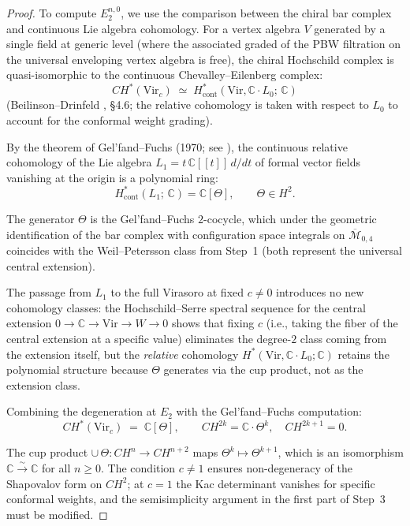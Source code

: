 \begin{proof}
To compute $E_2^{n,0}$, we use the comparison between the chiral bar
complex and continuous Lie algebra cohomology.  For a vertex algebra $V$
generated by a single field at generic level (where the associated graded
of the PBW filtration on the universal enveloping vertex algebra is free),
the chiral Hochschild complex is quasi-isomorphic to the continuous
Chevalley--Eilenberg complex:
\[
CH^*(\mathrm{Vir}_c) \;\simeq\;
H^*_{\mathrm{cont}}(\mathrm{Vir}, \mathbb{C} \cdot L_0;\, \mathbb{C})
\]
(Beilinson--Drinfeld \cite{BD04}, \S4.6; the relative cohomology is taken
with respect to $L_0$ to account for the conformal weight grading).


By the theorem of Gel'fand--Fuchs (1970; see \cite[Ch.~2, \S2]{Fuks86}),
the continuous relative cohomology of the Lie algebra $L_1 = t\,\mathbb{C}[[t]]\,d/dt$
of formal vector fields vanishing at the origin is a polynomial ring:
\[
H^*_{\mathrm{cont}}(L_1;\, \mathbb{C}) = \mathbb{C}[\Theta],
\qquad \Theta \in H^2.
\]

The generator $\Theta$ is the Gel'fand--Fuchs $2$-cocycle, which under the
geometric identification of the bar complex with configuration space integrals
on $\overline{\mathcal{M}}_{0,4}$ coincides with the Weil--Petersson class
from Step~1 (both represent the universal central extension).

The passage from $L_1$ to the full Virasoro at fixed $c \neq 0$ introduces
no new cohomology classes: the Hochschild--Serre spectral sequence for the
central extension $0 \to \mathbb{C} \to \mathrm{Vir} \to W \to 0$ shows
that fixing $c$ (i.e., taking the fiber of the central extension at a
specific value) eliminates the degree-$2$ class coming from the extension
itself, but the \emph{relative} cohomology $H^*(\mathrm{Vir}, \mathbb{C}
\cdot L_0; \mathbb{C})$ retains the polynomial structure because $\Theta$
generates via the cup product, not as the extension class.

Combining the degeneration at $E_2$ with the Gel'fand--Fuchs computation:
\[
CH^*(\mathrm{Vir}_c) \;=\; \mathbb{C}[\Theta],
\qquad CH^{2k} = \mathbb{C}\cdot\Theta^k,
\quad CH^{2k+1} = 0.
\]

The cup product
$\cup\,\Theta\colon CH^n \to CH^{n+2}$ maps $\Theta^k \mapsto \Theta^{k+1}$,
which is an isomorphism $\mathbb{C} \xrightarrow{\sim} \mathbb{C}$ for
all $n \geq 0$.
The condition $c \neq 1$ ensures non-degeneracy of the Shapovalov form
on $CH^2$; at $c = 1$ the Kac determinant vanishes for specific conformal
weights, and the semisimplicity argument in the first part of Step~3 must
be modified.
\end{proof}

